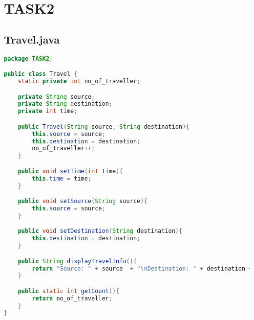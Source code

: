 \documentclass[11pt,a4paper]{article}
\begin{document}
\clearpage
\section*{TASK2}

\subsection*{Travel.java}
\begin{lstlisting}[style=codestyle,language=Java]
package TASK2;

public class Travel {
    static private int no_of_traveller;

    private String source;
    private String destination;
    private int time;

    public Travel(String source, String destination){
        this.source = source;
        this.destination = destination;
        no_of_traveller++;
    }

    public void setTime(int time){
        this.time = time;
    }

    public void setSource(String source){
        this.source = source;
    }

    public void setDestination(String destination){
        this.destination = destination;
    }

    public String displayTravelInfo(){  
        return "Source: " + source  + "\nDestination: " + destination + "\nTime: " + time + ":00";
    }

    public static int getCount(){
        return no_of_traveller;
    }
}
\end{lstlisting}
\end{document}
